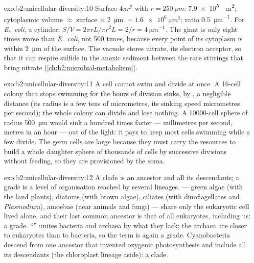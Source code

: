 \begin{solution}{exo:b2:unicellular-diversity:10}
Surface $4\pi r^2$ with $r = \qty{250}{\micro m}$: \qty{7.9e5}{\micro
m^2}; cytoplasmic volume $\approx$ surface $\times$ \qty{2}{\micro m}
$= \qty{1.6e6}{\micro m^3}$; ratio \qty{0.5}{\micro m^{-1}}. For
\emph{E.~coli}, a cylinder: $S/V = 2\pi r L/\pi r^2 L = 2/r =
\qty{4}{\micro m^{-1}}$. The giant is only eight times worse than
\emph{E.~coli}, not 500 times, because every point of its cytoplasm
is within \qty{2}{\micro m} of the surface. The vacuole stores
nitrate, its electron acceptor, so that it can respire sulfide in
the anoxic sediment between the rare stirrings that bring nitrate
(\cref{ch:b2:microbial-metabolism}).
\end{solution}

\begin{solution}{exo:b2:unicellular-diversity:11}
A cell cannot swim and divide at once. A 16-cell colony that stops
swimming for the hours of division sinks, by , a
negligible distance (its radius is a few tens of micrometres, its
sinking speed micrometres per second); the whole colony can divide
and lose nothing. A \num{10000}-cell sphere of radius
\qty{500}{\micro m} would sink a hundred times faster ---
millimetres per second, metres in an hour --- out of the light: it
pays to keep most cells swimming while a few divide. The germ cells
are large because they must carry the resources to build a whole
daughter sphere of thousands of cells by successive divisions
without feeding, so they are provisioned by the soma.
\end{solution}

\begin{solution}{exo:b2:unicellular-diversity:12}
A clade is an ancestor and all its descendants; a grade is a level
of organisation reached by several lineages.  --- green
algae (with the land plants), diatoms (with brown algae), ciliates
(with dinoflagellates and \emph{Plasmodium}), amoebae (near animals
and fungi) --- share only the eukaryotic cell lived alone, and their
last common ancestor is that of all eukaryotes, including us: a
grade. ``'' unites bacteria and archaea by what they lack;
the archaea are closer to eukaryotes than to bacteria, so the term
is again a grade. Cyanobacteria descend from one ancestor that
invented oxygenic photosynthesis and include all its descendants (the
chloroplast lineage aside): a clade.
\end{solution}

